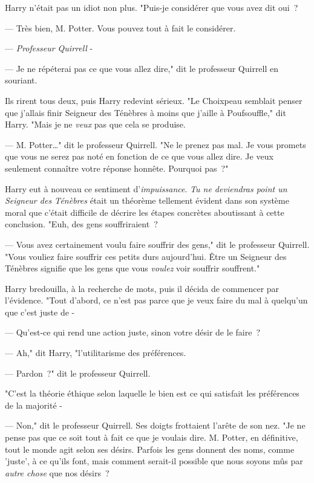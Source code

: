 Harry n'était pas un idiot non plus. "Puis-je considérer que vous avez dit oui~?

--- Très bien, M. Potter. Vous pouvez tout à fait le considérer.

--- \emph{Professeur Quirrell} -

--- Je ne répéterai pas ce que vous allez dire," dit le professeur Quirrell en souriant.

Ils rirent tous deux, puis Harry redevint sérieux. "Le Choixpeau semblait penser que j'allais finir Seigneur des Ténèbres à moins que j'aille à Poufsouffle," dit Harry. "Mais je ne \emph{veux} pas que cela se produise.

--- M. Potter…" dit le professeur Quirrell. "Ne le prenez pas mal. Je vous promets que vous ne serez pas noté en fonction de ce que vous allez dire. Je veux seulement connaître votre réponse honnête. Pourquoi pas~?"

Harry eut à nouveau ce sentiment d'\emph{impuissance}. \emph{Tu ne deviendras point un Seigneur des Ténèbres} était un théorème tellement évident dans son système moral que c'était difficile de décrire les étapes concrètes aboutissant à cette conclusion. "Euh, des gens souffriraient~?

--- Vous avez certainement voulu faire souffrir des gens," dit le professeur Quirrell. "Vous vouliez faire souffrir ces petits durs aujourd'hui. Être un Seigneur des Ténèbres signifie que les gens que vous \emph{voulez} voir souffrir souffrent."

Harry bredouilla, à la recherche de mots, puis il décida de commencer par l'évidence. "Tout d'abord, ce n'est pas parce que je veux faire du mal à quelqu'un que c'est juste de -

--- Qu'est-ce qui rend une action juste, sinon votre désir de le faire~?

--- Ah," dit Harry, "l'utilitarisme des préférences.

--- Pardon~?" dit le professeur Quirrell.

"C'est la théorie éthique selon laquelle le bien est ce qui satisfait les préférences de la majorité -

--- Non," dit le professeur Quirrell. Ses doigts frottaient l'arête de son nez. "Je ne pense pas que ce soit tout à fait ce que je voulais dire. M. Potter, en définitive, tout le monde agit selon ses désirs. Parfois les gens donnent des noms, comme 'juste', à ce qu'ils font, mais comment serait-il possible que nous soyons mûs par \emph{autre chose} que nos désirs~?

